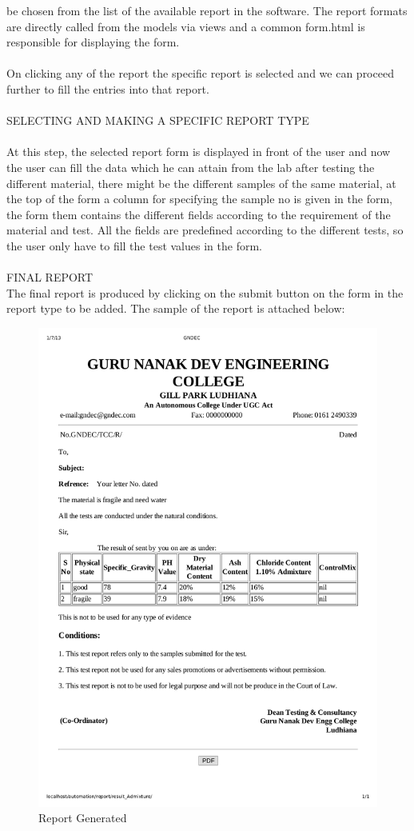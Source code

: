 be chosen from the list of the available report in the software. The 
report formats are directly called from the models via views and a 
common form.html is responsible for displaying the form.\\\\
On clicking any of the report the specific report is selected and we 
can proceed further to fill the entries into that report.\\\\
SELECTING AND MAKING A SPECIFIC REPORT TYPE\\\\
At this step, the selected report form is displayed in front of the 
user and now the user can fill the data which he can attain from the 
lab after testing the different material, there might be the different 
samples of the same material, at the top of the form a column for 
specifying the sample no is given in the form, the form them contains 
the different fields according to the requirement of the material and 
test. All the fields are predefined according to the different tests, 
so the user only have to fill the test values in the form.\\\\
FINAL REPORT\\
The final report is produced by clicking on the submit button on the 
form in the report type to be added. The sample of the report is 
attached below: 
\newpage
\begin{figure}[h]
\centering \includegraphics[scale=0.1]{images/GNDEC.png}
\caption{Report Generated}
\end{figure}
